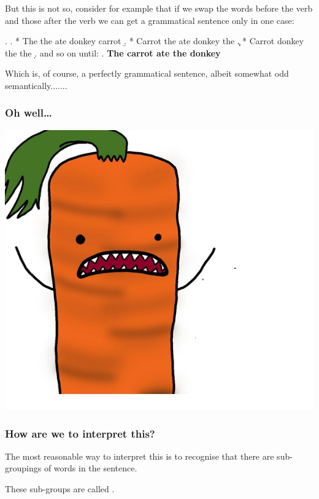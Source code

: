\begin{frame}
  But this is not so, consider for example that if we swap the words before the verb and those after the verb we can get a grammatical sentence only in one case:

\ex. 
\a. * The the ate donkey carrot
\b. * Carrot the ate donkey the
\c. * Carrot donkey the the
\d.  and so on until:  \pause
\e. \textbf{The carrot ate the donkey}


Which is, of course, a perfectly grammatical sentence, albeit somewhat odd semantically.......

\end{frame}

\begin{frame}
\frametitle{Oh well\ldots}
  \begin{center}
    \includegraphics[scale=.4]{carrot.jpg}
  \end{center}
\end{frame}


\begin{frame}
\frametitle{How are we to interpret this?}

The most reasonable way to interpret this is to recognise that there are sub-groupings of words in the sentence. 

These sub-groups are called .   

\end{frame}

